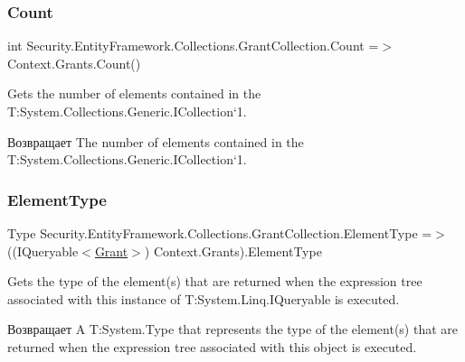 \subsubsection{\texorpdfstring{Count}{Count}}
{\footnotesize\ttfamily int Security.\+Entity\+Framework.\+Collections.\+Grant\+Collection.\+Count =$>$ Context.\+Grants.\+Count()}



Gets the number of elements contained in the T\+:\+System.\+Collections.\+Generic.\+I\+Collection`1. 

\begin{DoxyReturn}{Возвращает}
The number of elements contained in the T\+:\+System.\+Collections.\+Generic.\+I\+Collection`1. 
\end{DoxyReturn}
\mbox{\label{class_security_1_1_entity_framework_1_1_collections_1_1_grant_collection_ae55be1ee2addfb47c9571f51331afaa4}} 
\subsubsection{\texorpdfstring{Element\+Type}{ElementType}}
{\footnotesize\ttfamily Type Security.\+Entity\+Framework.\+Collections.\+Grant\+Collection.\+Element\+Type =$>$ ((I\+Queryable$<$\hyperlink{class_security_1_1_model_1_1_grant}{Grant}$>$) Context.\+Grants).Element\+Type}



Gets the type of the element(s) that are returned when the expression tree associated with this instance of T\+:\+System.\+Linq.\+I\+Queryable is executed. 

\begin{DoxyReturn}{Возвращает}
A T\+:\+System.\+Type that represents the type of the element(s) that are returned when the expression tree associated with this object is executed. 
\end{DoxyReturn}
\mbox{\label{class_security_1_1_entity_framework_1_1_collections_1_1_grant_collection_aa08b5ab575562a16149a4a2ffef6dbbd}} 
